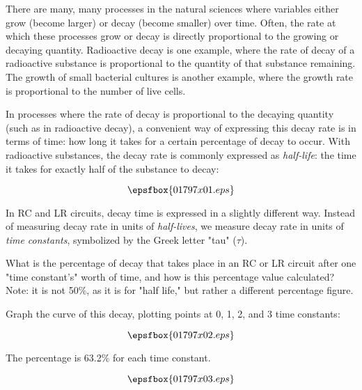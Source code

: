 

There are many, many processes in the natural sciences where variables either grow (become larger) or decay (become smaller) over time.  Often, the rate at which these processes grow or decay is directly proportional to the growing or decaying quantity.  Radioactive decay is one example, where the rate of decay of a radioactive substance is proportional to the quantity of that substance remaining.  The growth of small bacterial cultures is another example, where the growth rate is proportional to the number of live cells.

In processes where the rate of decay is proportional to the decaying quantity (such as in radioactive decay), a convenient way of expressing this decay rate is in terms of time: how long it takes for a certain percentage of decay to occur.  With radioactive substances, the decay rate is commonly expressed as {\it half-life}: the time it takes for exactly half of the substance to decay:

$$\epsfbox{01797x01.eps}$$

In RC and LR circuits, decay time is expressed in a slightly different way.  Instead of measuring decay rate in units of {\it half-lives}, we measure decay rate in units of {\it time constants}, symbolized by the Greek letter "tau" ($\tau$).

What is the percentage of decay that takes place in an RC or LR circuit after one "time constant's" worth of time, and how is this percentage value calculated?  Note: it is not 50\%, as it is for "half life," but rather a different percentage figure.

Graph the curve of this decay, plotting points at 0, 1, 2, and 3 time constants:

$$\epsfbox{01797x02.eps}$$







The percentage is 63.2\% for each time constant.

$$\epsfbox{01797x03.eps}$$






